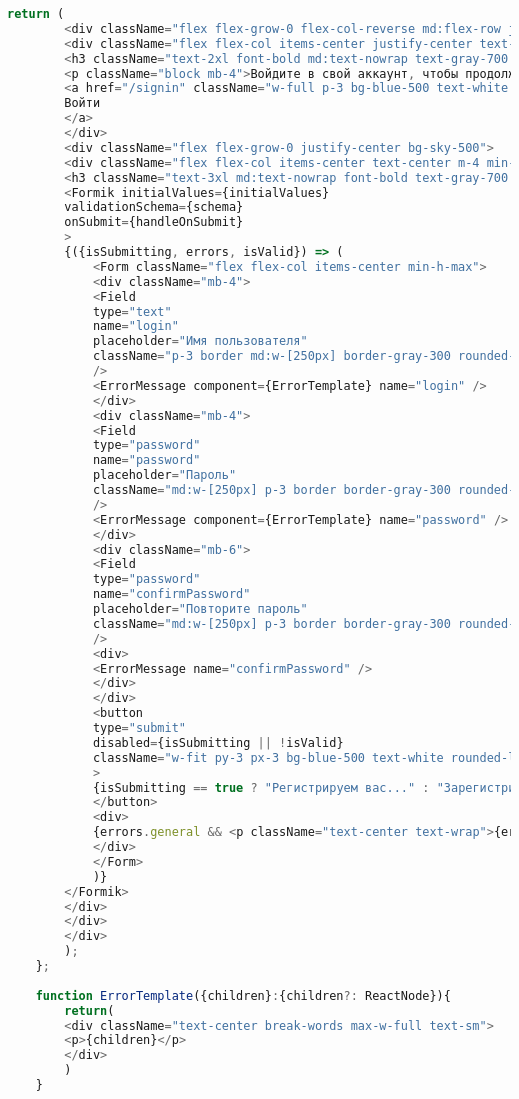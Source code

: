 \begin{lstlisting}[language=javascript]
		return (
		<div className="flex flex-grow-0 flex-col-reverse md:flex-row justify-between items-center md:rounded-2xl md:max-w-min md:min-h-max shadow-[0px_20px_20px_10px_#00000024] overflow-hidden">
		<div className="flex flex-col items-center justify-center text-center self-stretch m-4">
		<h3 className="text-2xl font-bold md:text-nowrap text-gray-700 mb-4 block">Уже зарегистрированы?</h3>
		<p className="block mb-4">Войдите в свой аккаунт, чтобы продолжить общение</p>
		<a href="/signin" className="w-full p-3 bg-blue-500 text-white rounded-lg border-2 border-white max-w-32 hover:bg-blue-600 focus:outline-none focus:ring-2 focus:ring-blue-400">
		Войти
		</a>
		</div>
		<div className="flex flex-grow-0 justify-center bg-sky-500">
		<div className="flex flex-col items-center text-center m-4 min-h-full">
		<h3 className="text-3xl md:text-nowrap font-bold text-gray-700 mb-4" >Присоединяйтесь к нам!</h3>
		<Formik initialValues={initialValues}
		validationSchema={schema}
		onSubmit={handleOnSubmit}
		>
		{({isSubmitting, errors, isValid}) => (
			<Form className="flex flex-col items-center min-h-max">
			<div className="mb-4">
			<Field
			type="text"
			name="login"
			placeholder="Имя пользователя"
			className="p-3 border md:w-[250px] border-gray-300 rounded-lg focus:outline-none focus:ring-2 focus:ring-blue-400"
			/>
			<ErrorMessage component={ErrorTemplate} name="login" />
			</div>
			<div className="mb-4">
			<Field
			type="password"
			name="password"
			placeholder="Пароль"
			className="md:w-[250px] p-3 border border-gray-300 rounded-lg focus:outline-none focus:ring-2 focus:ring-blue-400"
			/>
			<ErrorMessage component={ErrorTemplate} name="password" />
			</div>
			<div className="mb-6">
			<Field
			type="password"
			name="confirmPassword"
			placeholder="Повторите пароль"
			className="md:w-[250px] p-3 border border-gray-300 rounded-lg focus:outline-none focus:ring-2 focus:ring-blue-400"
			/>
			<div>
			<ErrorMessage name="confirmPassword" />
			</div>
			</div>
			<button
			type="submit"
			disabled={isSubmitting || !isValid}
			className="w-fit py-3 px-3 bg-blue-500 text-white rounded-lg border-2 border-white disabled:opacity-50 disabled:cursor-not-allowed disabled:pointer-events-none hover:bg-blue-600 focus:outline-none focus:ring-2 focus:ring-blue-400"
			>
			{isSubmitting == true ? "Регистрируем вас..." : "Зарегистрироваться"}
			</button>
			<div>
			{errors.general && <p className="text-center text-wrap">{errors.general}</p>}
			</div>
			</Form>
			)}
		</Formik>
		</div>
		</div>
		</div>
		);
	};
	
	function ErrorTemplate({children}:{children?: ReactNode}){
		return(
		<div className="text-center break-words max-w-full text-sm">
		<p>{children}</p>
		</div>
		)
	}
\end{lstlisting}

